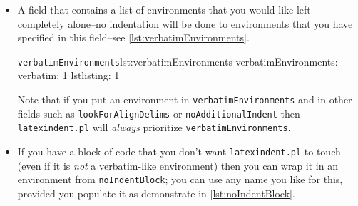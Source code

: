 \documentclass[11pt]{article}
\newcommand{\verbitem}[1]{\small\PVerb{#1}}
\begin{document}
\begin{itemize}
	If you find that \lstinline!latexindent.pl! does not perform satisfactorily on such
	environments then you can either remove them from \lstinline!lookForAlignDelims! altogether, or set the relevant key to \lstinline!0!, for example \lstinline!tabular: 0!, or if you just want to ignore \emph{specific}
	instances of the environment, you could wrap them in something from \lstinline!noIndentBlock! (see \cref{lst:noIndentBlock}).

	If you have blocks of code that you wish to align at the \&  character that
	      are \emph{not} wrapped in, for example, \lstinline!\begin{tabular}...\end{tabular}!, then you use the mark up
	      illustrated in \cref{lst:alignmentmarkup}. Note that the \lstinline!%*! must be next to
	      each other, but that there can be any number of spaces (possibly none) between the
	      \lstinline!*! and \lstinline!\begin{tabular}!; note also that you may use any
	      environment name that you have specified in \lstinline!lookForAlignDelims!.
	      \begin{cmhlistings}[style=demo,columns=fixed]{Mark up for aligning delimiters outside of environments}{lst:alignmentmarkup}
	\end{cmhlistings}

	\item[\verbitem{verbatimEnvironments}] A field that contains a list of environments
	      that you would like left completely alone--no indentation will be done
	      to environments that you have specified in this field--see \cref{lst:verbatimEnvironments}.


	      \begin{cmhlistings}[style=yaml]{\lstinline!verbatimEnvironments!}{lst:verbatimEnvironments}
verbatimEnvironments:
    verbatim: 1
    lstlisting: 1
	\end{cmhlistings}
	Note that if  you put an environment in \lstinline!verbatimEnvironments!
	and in other fields such as \lstinline!lookForAlignDelims! or \lstinline!noAdditionalIndent!
	then \lstinline!latexindent.pl! will \emph{always} prioritize \lstinline!verbatimEnvironments!.

	\item[\verbitem{noIndentBlock}] If you have a block of code that you don't
	      want \lstinline!latexindent.pl! to touch (even if it is \emph{not} a verbatim-like
	      environment) then you can wrap it in an environment from \lstinline!noIndentBlock!;
	      you can use any name you like for this, provided you populate it as demonstrate in
	      \cref{lst:noIndentBlock}.


\end{itemize}
\end{document}
